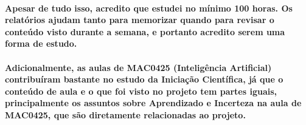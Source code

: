 \documentclass[a4paper,10pt]{article}
\theoremstyle{plain}
\begin{document}
\paragraph{
  Apesar de tudo isso, acredito que estudei no mínimo 100 horas. Os relatórios ajudam tanto para
  memorizar quando para revisar o conteúdo visto durante a semana, e portanto acredito serem uma
  forma de estudo.
}

\paragraph{
  Adicionalmente, as aulas de MAC0425 (Inteligência Artificial) contribuíram bastante no estudo da
  Iniciação Científica, já que o conteúdo de aula e o que foi visto no projeto tem partes iguais,
  principalmente os assuntos sobre Aprendizado e Incerteza na aula de MAC0425, que são diretamente
  relacionadas ao projeto.
}

\newpage

\printbibliography
\end{document}
